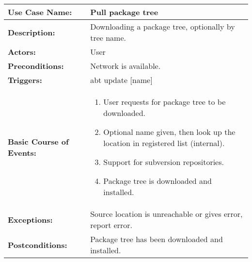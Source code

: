 
\begin{tabularx}{\linewidth}{|l|X|}
\hline
\textbf{Use Case Name:} & \textbf{Pull package tree} \\
\hline
\textbf{Description:} & 
Downloading a package tree, optionally by tree name. \\
\hline
\textbf{Actors:} & User \\
\hline
\textbf{Preconditions:} & 
Network is available. \\
\hline
\textbf{Triggers:} & abt update $[$name$]$  \\
\hline
\textbf{Basic Course of Events:} & 
\begin{minipage}{\linewidth} 
  \vspace{0.05em}
  \begin{enumerate}
    \item User requests for package tree to be downloaded.
    \item Optional name given, then look up the location in registered list (internal).
    \item Support for subversion repositories.
    \item Package tree is downloaded and installed.
  \end{enumerate}
  \vspace{0.05em}
\end{minipage}
\\
\hline
\textbf{Exceptions:} & 
Source location is unreachable or gives error, report error. \\
\hline 
\textbf{Postconditions:} &
Package tree has been downloaded and installed.
\\
\hline
\end{tabularx}


